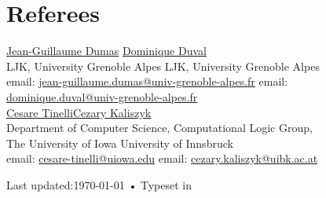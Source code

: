 \documentclass[10pt, a4paper]{article}
\begin{document}
\section*{Referees}
\href{http://ljk.imag.fr/membres/Jean-Guillaume.Dumas/}{Jean-Guillaume Dumas} \hfill \href{http://ljk.imag.fr/membres/Dominique.Duval/}{Dominique Duval}\\
LJK, University Grenoble Alpes \hfill LJK, University Grenoble Alpes\\
email: \href{mailto:jean-guillaume.dumas@univ-grenoble-alpes.fr}{jean-guillaume.dumas@univ-grenoble-alpes.fr} \hfill email: \href{mailto:dominique.duval@univ-grenoble-alpes.fr}{dominique.duval@univ-grenoble-alpes.fr}\\

\href{http://homepage.cs.uiowa.edu/~tinelli/index.html}{Cesare Tinelli}\hfill \href{http://cl-informatik.uibk.ac.at/users/cek/}{Cezary Kaliszyk}\\
Department of Computer Science, \hfill Computational Logic Group,\\
The University of Iowa \hfill University of Innsbruck\\
email: \href{mailto:cesare-tinelli@uiowa.edu}{cesare-tinelli@uiowa.edu} \hfill email: \href{mailto:cezary.kaliszyk@uibk.ac.at}{cezary.kaliszyk@uibk.ac.at}\\




\begin{center}
{\scriptsize  Last updated:\today\- •\- 
Typeset in \href{http://en.wikipedia.org/wiki/XeTeX}{
\XeTeX}}
\end{center}
\end{document}
